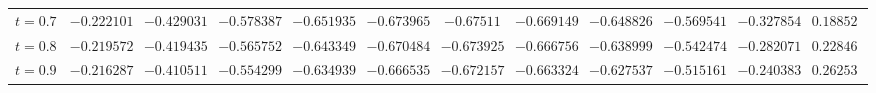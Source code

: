 \begin{table}[h!]
\begin{tabular}{|l|rrrrrrrrrrr|}
		$   t = 0.7$ & $      -0.222101$ & $      -0.429031$ & $      -0.578387$ & $      -0.651935$ & $      -0.673965$ & $       -0.67511$ & $      -0.669149$ & $      -0.648826$ & $      -0.569541$ & $      -0.327854$ & $       0.188529$ \\
		$   t = 0.8$ & $      -0.219572$ & $      -0.419435$ & $      -0.565752$ & $      -0.643349$ & $      -0.670484$ & $      -0.673925$ & $      -0.666756$ & $      -0.638999$ & $      -0.542474$ & $      -0.282071$ & $       0.228462$ \\
		$   t = 0.9$ & $      -0.216287$ & $      -0.410511$ & $      -0.554299$ & $      -0.634939$ & $      -0.666535$ & $      -0.672157$ & $      -0.663324$ & $      -0.627537$ & $      -0.515161$ & $      -0.240383$ & $       0.262536$ \\
		\hline
	\end{tabular}
\end{table}

